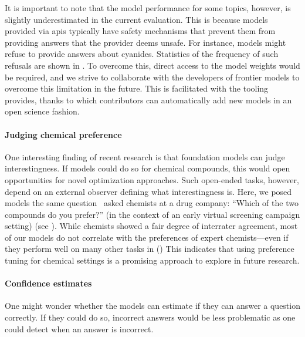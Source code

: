 \documentclass[11pt, oneside]{article}
\begin{document}
\begin{refsection}
It is important to note that the model performance for some topics, however, is slightly underestimated in the current evaluation.
 This is because models provided via \glspl{api} typically have safety mechanisms that prevent them from providing answers that the provider deems unsafe.
 For instance, models might refuse to provide answers about cyanides. Statistics of the frequency of such refusals are shown in .
 To overcome this, direct access to the model weights would be required, and we strive to collaborate with the developers of frontier models to overcome this limitation in the future.
 This is facilitated with the tooling \chembench provides, thanks to which contributors can automatically add new models in an open science fashion.

\paragraph{Judging chemical preference}

One interesting finding of recent research is that foundation models can judge interestingness.\autocite{zhang2024omniopenendednessmodelshuman, Argyle_2023}
If models could do so for chemical compounds, this would open opportunities for novel optimization approaches.
Such open-ended tasks, however, depend on an external observer defining what interestingness is.\autocite{hughes2024openendednessessentialartificialsuperhuman}
Here, we posed models the same question~\textcite{Choung_2023} asked chemists at a drug company: \enquote{Which of the two compounds do you prefer?} (in the context of an early virtual screening campaign setting) (see ).
While chemists showed a fair degree of interrater agreement, most of our models do not correlate with the preferences of expert chemists---even if they perform well on many other tasks in \chembench ()
This indicates that using preference tuning for chemical settings is a promising approach to explore in future research.


\paragraph{Confidence estimates} One might wonder whether the models can estimate if they can answer a question correctly.
If they could do so, incorrect answers would be less problematic as one could detect when an answer is incorrect.


\end{refsection}
\end{document}
